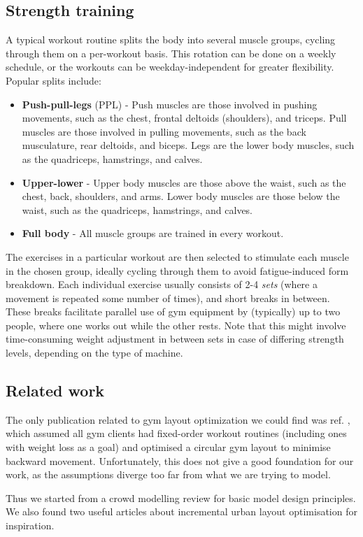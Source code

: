 \documentclass[9pt]{pnas-new}
\begin{document}
\subsection*{Strength training}
A typical workout routine splits the body into several muscle groups, cycling through them on a per-workout basis. This rotation can be done on a weekly schedule, or the workouts can be weekday-independent for greater flexibility. Popular splits include:
\begin{itemize}
	\item \textbf{Push-pull-legs} (PPL) - Push muscles are those involved in pushing movements,
	such as the chest, frontal deltoids (shoulders), and triceps. Pull muscles are those involved in pulling movements, such as the back musculature, rear deltoids, and biceps. Legs are the lower body muscles, such as the quadriceps, hamstrings, and calves.
	\item \textbf{Upper-lower} - Upper body muscles are those above the waist, such as the chest, back, shoulders, and arms. Lower body muscles are those below the waist, such as the quadriceps, hamstrings, and calves.
	\item \textbf{Full body} - All muscle groups are trained in every workout.
\end{itemize}
The exercises in a particular workout are then selected to stimulate each muscle in the chosen group, ideally cycling through them to avoid fatigue-induced form breakdown. Each individual exercise usually consists of 2-4 {\it sets} (where a movement is repeated some number of times), and short breaks in between. These breaks facilitate parallel use of gym equipment by (typically) up to two people, where one works out while the other rests. Note that this might involve time-consuming weight adjustment in between sets in case of differing strength levels, depending on the type of machine.


\subsection*{Related work}
The only publication related to gym layout optimization we could find was ref. \cite{turcine2022gym}, which assumed all gym clients had fixed-order workout routines (including ones with weight loss as a goal) and optimised a circular gym layout to minimise backward movement. Unfortunately, this does not give a good foundation for our work, as the assumptions diverge too far from what we are trying to model.

Thus we started from a crowd modelling review \cite{yang2020crowd_modelling_review} for basic model design principles. We also found two useful articles about incremental urban layout optimisation \cite{feng2016crowd_drive_layout_design, mathew2019urban_walkability} for inspiration.
\end{document}

